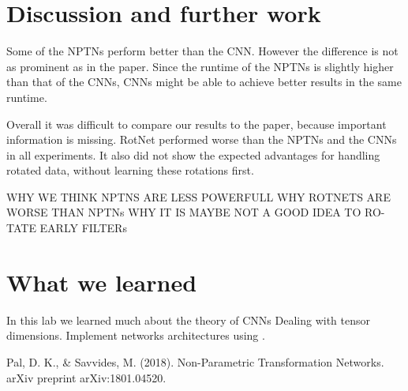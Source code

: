 \documentclass{llncs}
\begin{document}
\section{Discussion and further work}
Some of the NPTNs perform better than the CNN. However the difference is not as prominent as in the paper. Since the runtime of the NPTNs is slightly higher than that of the CNNs, CNNs might be able to achieve better results in the same runtime.

Overall it was difficult to compare our results to the paper, because important information is missing. 
RotNet performed worse than the NPTNs and the CNNs in all experiments.
It also did not show the expected advantages for handling rotated data, without learning these rotations first. 

WHY WE THINK NPTNS ARE LESS POWERFULL WHY ROTNETS ARE
WORSE THAN NPTNs WHY IT IS MAYBE NOT A GOOD IDEA TO RO-
TATE EARLY FILTERs

\section{What we learned}
In this lab we learned much about the theory of CNNs 
Dealing with tensor dimensions.
Implement networks architectures using \pytorch.

%
%
\begin{thebibliography}{}
%
Pal, D. K., \& Savvides, M. (2018). Non-Parametric Transformation Networks. arXiv preprint arXiv:1801.04520.


%
%


\end{thebibliography}
%
\end{document}
